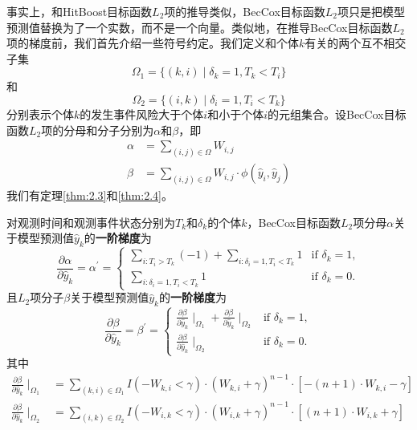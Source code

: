 事实上，和HitBoost目标函数$L_2$项的推导类似，BecCox目标函数$L_2$项只是把模型预测值替换为了一个实数，而不是一个向量。类似地，在推导BecCox目标函数$L_2$项的梯度前，我们首先介绍一些符号约定。我们定义和个体$k$有关的两个互不相交子集$$
\Omega_1=\{(k,i) \mid \delta_k=1,T_k < T_i\}
$$
和$$
\Omega_2=\{(i,k) \mid \delta_i=1,T_i < T_k\}
$$
分别表示个体$k$的发生事件风险大于个体$i$和小于个体$i$的元组集合。设BecCox目标函数$L_2$项的分母和分子分别为$\alpha$和$\beta$，即\[
\begin{split}
\alpha &= \sum_{(i,j)\in \Omega} W_{i,j}\\
\beta &= \sum_{(i,j)\in \Omega} W_{i,j} \cdot \phi\left(\hat{y}_i, \hat{y}_j \right)
\end{split}
\]
我们有定理\ref{thm:2.3}和\ref{thm:2.4}。

\begin{theorem}\label{thm:2.3}
对观测时间和观测事件状态分别为$T_k$和$\delta_k$的个体$k$，BecCox目标函数$L_2$项分母$\alpha$关于模型预测值$\hat{y}_k$的\textbf{一阶梯度}为$$
\frac{\partial \alpha}{\partial \hat{y}_k}=\alpha^{'}=
\begin{cases}
\sum\limits_{i: T_i>T_k}(-1) + \sum\limits_{i: \delta_i=1,T_i<T_k} 1 & \text{if } \delta_k = 1,\\
\sum\limits_{i: \delta_i=1,T_i<T_k} 1 & \text{if } \delta_k = 0.
\end{cases}
$$ 且$L_2$项分子$\beta$关于模型预测值$\hat{y}_k$的\textbf{一阶梯度}为$$
\frac{\partial \beta}{\partial \hat{y}_k}=\beta^{'}=
\begin{cases}
\frac{\partial \beta}{\partial \hat{y}_k} \mid_{\Omega_1} + \frac{\partial \beta}{\partial \hat{y}_k} \mid_{\Omega_2} & \text{if } \delta_k = 1,\\
\frac{\partial \beta}{\partial \hat{y}_k} \mid_{\Omega_2} & \text{if } \delta_k = 0.
\end{cases}
$$ 其中\[
\begin{split}
\frac{\partial \beta}{\partial \hat{y}_k} \mid_{\Omega_1} &= \sum\limits_{(k,i)\in \Omega_1} {I(-W_{k,i}<\gamma)\cdot (W_{k,i}+\gamma)^{n-1}\cdot [-(n+1)\cdot W_{k,i}-\gamma]} \\
\frac{\partial \beta}{\partial \hat{y}_k} \mid_{\Omega_2} &= \sum\limits_{(i,k)\in \Omega_2} {I(-W_{i,k}<\gamma)\cdot (W_{i,k}+\gamma)^{n-1}\cdot [(n+1)\cdot W_{i,k}+\gamma]}
\end{split}
\]
\end{theorem}

